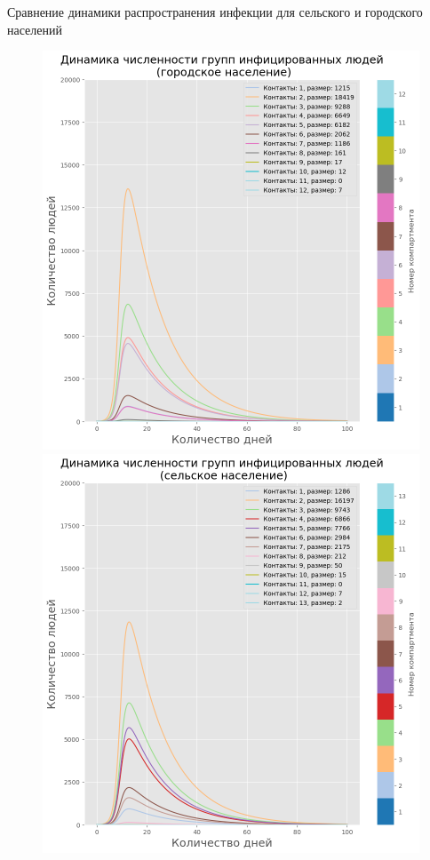 \documentclass[10pt, unicode, xcolor={svgnames, table, hyperref}]{beamer}
\begin{document}
\begin{frame}{Сравнение динамики распространения инфекции для сельского и городского населений}
	
	\begin{figure}[h!]
		\begin{minipage}{0.49\textwidth}
			\centering
			\includegraphics[width=1.0\textwidth]{img/sir_model_compare_I_urban_new.png}
		\end{minipage}
		\begin{minipage}{0.49\textwidth}
			\centering
			\includegraphics[width=1.0\textwidth]{img/sir_model_compare_I_rural_new.png}

\end{minipage}
\end{figure}
\end{frame}
\end{document}
